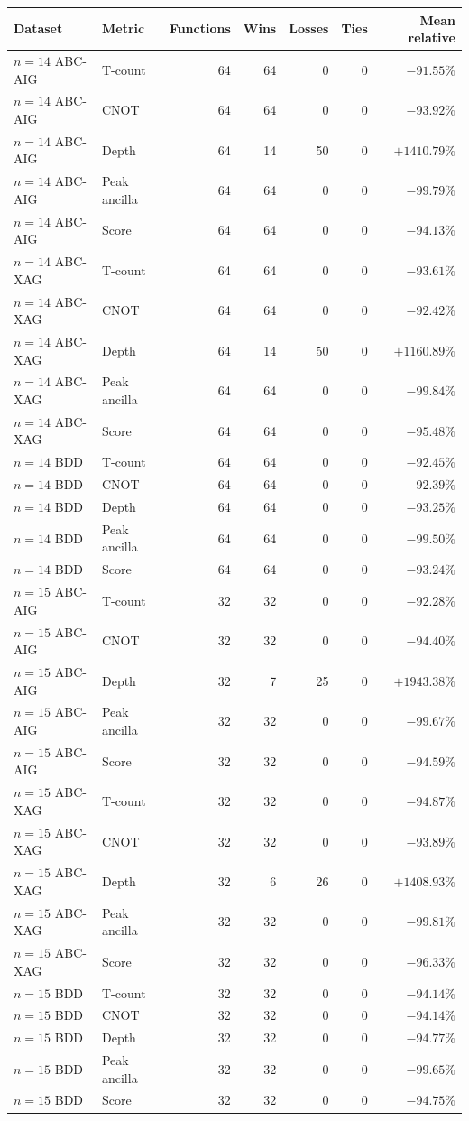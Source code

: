 \begin{tabular}{llrrrrr}
\toprule
Dataset & Metric & Functions & Wins & Losses & Ties & Mean relative \\
\midrule
$n=14$ ABC-AIG & T-count & 64 & 64 & 0 & 0 & $-91.55\%$ \\
$n=14$ ABC-AIG & CNOT & 64 & 64 & 0 & 0 & $-93.92\%$ \\
$n=14$ ABC-AIG & Depth & 64 & 14 & 50 & 0 & $+1410.79\%$ \\
$n=14$ ABC-AIG & Peak ancilla & 64 & 64 & 0 & 0 & $-99.79\%$ \\
$n=14$ ABC-AIG & Score & 64 & 64 & 0 & 0 & $-94.13\%$ \\
$n=14$ ABC-XAG & T-count & 64 & 64 & 0 & 0 & $-93.61\%$ \\
$n=14$ ABC-XAG & CNOT & 64 & 64 & 0 & 0 & $-92.42\%$ \\
$n=14$ ABC-XAG & Depth & 64 & 14 & 50 & 0 & $+1160.89\%$ \\
$n=14$ ABC-XAG & Peak ancilla & 64 & 64 & 0 & 0 & $-99.84\%$ \\
$n=14$ ABC-XAG & Score & 64 & 64 & 0 & 0 & $-95.48\%$ \\
$n=14$ BDD & T-count & 64 & 64 & 0 & 0 & $-92.45\%$ \\
$n=14$ BDD & CNOT & 64 & 64 & 0 & 0 & $-92.39\%$ \\
$n=14$ BDD & Depth & 64 & 64 & 0 & 0 & $-93.25\%$ \\
$n=14$ BDD & Peak ancilla & 64 & 64 & 0 & 0 & $-99.50\%$ \\
$n=14$ BDD & Score & 64 & 64 & 0 & 0 & $-93.24\%$ \\
$n=15$ ABC-AIG & T-count & 32 & 32 & 0 & 0 & $-92.28\%$ \\
$n=15$ ABC-AIG & CNOT & 32 & 32 & 0 & 0 & $-94.40\%$ \\
$n=15$ ABC-AIG & Depth & 32 & 7 & 25 & 0 & $+1943.38\%$ \\
$n=15$ ABC-AIG & Peak ancilla & 32 & 32 & 0 & 0 & $-99.67\%$ \\
$n=15$ ABC-AIG & Score & 32 & 32 & 0 & 0 & $-94.59\%$ \\
$n=15$ ABC-XAG & T-count & 32 & 32 & 0 & 0 & $-94.87\%$ \\
$n=15$ ABC-XAG & CNOT & 32 & 32 & 0 & 0 & $-93.89\%$ \\
$n=15$ ABC-XAG & Depth & 32 & 6 & 26 & 0 & $+1408.93\%$ \\
$n=15$ ABC-XAG & Peak ancilla & 32 & 32 & 0 & 0 & $-99.81\%$ \\
$n=15$ ABC-XAG & Score & 32 & 32 & 0 & 0 & $-96.33\%$ \\
$n=15$ BDD & T-count & 32 & 32 & 0 & 0 & $-94.14\%$ \\
$n=15$ BDD & CNOT & 32 & 32 & 0 & 0 & $-94.14\%$ \\
$n=15$ BDD & Depth & 32 & 32 & 0 & 0 & $-94.77\%$ \\
$n=15$ BDD & Peak ancilla & 32 & 32 & 0 & 0 & $-99.65\%$ \\
$n=15$ BDD & Score & 32 & 32 & 0 & 0 & $-94.75\%$ \\
\bottomrule
\end{tabular}
